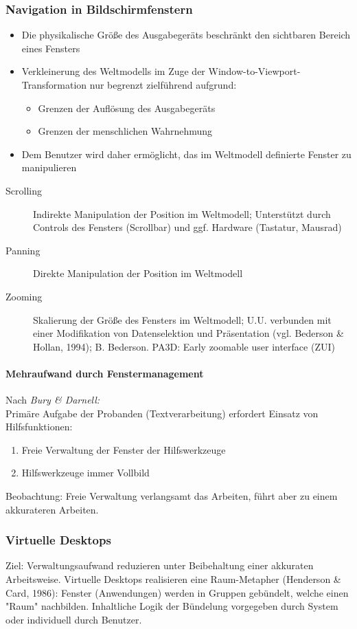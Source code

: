 \documentclass
[
	8pt,		%
	ngerman,	%
	a4paper,	%
	landscape,	%
	final		%
]{extarticle}
\begin{document}
\begin{multicols*}{4}
	\subsubsection{Navigation in Bildschirmfenstern}
	\begin{itemize}
		\item Die physikalische Größe des Ausgabegeräts beschränkt den sichtbaren
		      Bereich eines Fensters
		\item Verkleinerung des Weltmodells im Zuge der Window-to-Viewport-Transformation
		      nur begrenzt zielführend aufgrund:
		      \begin{itemize}
			      \item Grenzen der Auflösung des Ausgabegeräts
			      \item Grenzen der menschlichen Wahrnehmung
		      \end{itemize}
		\item Dem Benutzer wird daher ermöglicht, das im Weltmodell definierte Fenster zu
		      manipulieren
	\end{itemize}
	\begin{description}
		\item[Scrolling] Indirekte Manipulation der Position im Weltmodell;
		      Unterstützt durch Controls des Fensters (Scrollbar) und ggf.
		      Hardware (Tastatur, Mausrad)
		\item[Panning] Direkte Manipulation der Position im Weltmodell
		\item[Zooming] Skalierung der Größe des Fensters im Weltmodell;
		      U.U. verbunden mit einer Modifikation von Datenselektion und
		      Präsentation (vgl. Bederson \& Hollan, 1994);
		      B. Bederson. PA3D: Early zoomable user interface (ZUI)
	\end{description}
	\paragraph{Mehraufwand durch Fenstermanagement}
	Nach \emph{Bury \& Darnell:}\\
	Primäre Aufgabe der Probanden (Textverarbeitung) erfordert Einsatz von
	Hilfsfunktionen:
	\begin{enumerate}
		\item Freie Verwaltung der Fenster der Hilfswerkzeuge
		\item Hilfswerkzeuge immer Vollbild
	\end{enumerate}
	Beobachtung: Freie Verwaltung verlangsamt das Arbeiten, führt aber zu einem
	akkurateren Arbeiten.
	\subsubsection{Virtuelle Desktops}
	Ziel: Verwaltungsaufwand reduzieren unter Beibehaltung einer akkuraten
	Arbeitsweise. Virtuelle Desktops realisieren eine Raum-Metapher
	(Henderson \& Card, 1986): Fenster (Anwendungen) werden in Gruppen
	gebündelt, welche einen "Raum" nachbilden. Inhaltliche Logik der Bündelung
	vorgegeben durch System oder individuell durch Benutzer.

\end{multicols*}
\end{document}
